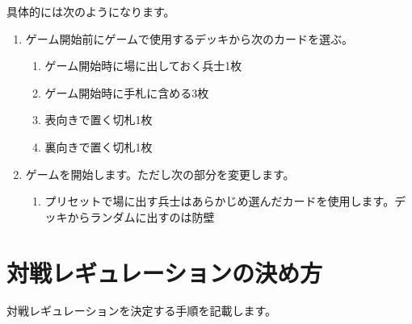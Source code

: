 \documentclass[letterpaper,10pt,dvipdfmx]{sphinxmanual}
\makeatletter
\renewcommand\sphinxlineitem[2]{%
  \sphinx@gobto@sphinxlineitem#2\@gobbletwo\sphinxlineitem\unless
  \iftrue
    \spx@lineitemlabel\expandafter{\the\spx@lineitemlabel\strut#1\\}%
  \else
    \item[\kern\labelwidth\kern-\itemindent\kern-\leftmargin
          {\parbox[t]{1.4\linewidth}{%
          \raggedright
          \the\spx@lineitemlabel%
          \strut#1}}%
          \kern-\labelsep]%
    \spx@lineitemlabel{}%
    \leavevmode
  \fi #2%
}
\makeatother
\begin{document}
\sphinxAtStartPar
具体的には次のようになります。
\begin{enumerate}
%
\item {} 
\sphinxAtStartPar
ゲーム開始前にゲームで使用するデッキから次のカードを選ぶ。
\begin{enumerate}
%
\item {} 
\sphinxAtStartPar
ゲーム開始時に場に出しておく兵士1枚

\item {} 
\sphinxAtStartPar
ゲーム開始時に手札に含める3枚

\item {} 
\sphinxAtStartPar
表向きで置く切札1枚

\item {} 
\sphinxAtStartPar
裏向きで置く切札1枚

\end{enumerate}

\item {} 
\sphinxAtStartPar
ゲームを開始します。ただし次の部分を変更します。
\begin{enumerate}
%
\item {} 
\sphinxAtStartPar
プリセットで場に出す兵士はあらかじめ選んだカードを使用します。デッキからランダムに出すのは防壁

\end{enumerate}

\end{enumerate}


\section{対戦レギュレーションの決め方}
\label{\detokenize{match-regulations/match-regulations:id14}}
\sphinxAtStartPar
対戦レギュレーションを決定する手順を記載します。
\end{document}
